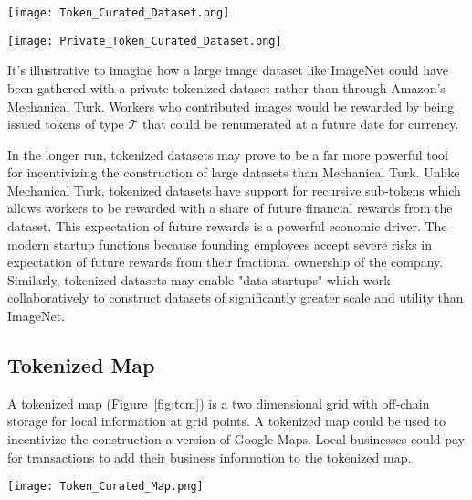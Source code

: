 \documentclass{llncs}
\begin{document}
\begin{figure*}[h]
  \centering
  \texttt{[image: Token\_Curated\_Dataset.png]}
  \caption{A tokenized dataset. For example, the tokenized dataset might hold an image dataset with the images stored off-chain. Note that the data is set to be publicly visible.}
  \label{fig:tcdataset}
\end{figure*}

\begin{figure*}[h]
  \centering
  \texttt{[image: Private\_Token\_Curated\_Dataset.png]}
  \caption{A Private tokenized dataset. In this particular representation, data stored off-chain are not publicly visible.}
  \label{fig:privtcdataset}
\end{figure*}


It's illustrative to imagine how a large image dataset like ImageNet \cite{deng2009imagenet} could have been gathered with a private tokenized dataset rather than through Amazon's Mechanical Turk. Workers who contributed images would be rewarded by being issued tokens of type $\mathcal{T}$ that could be renumerated at a future date for currency.

In the longer run, tokenized datasets may prove to be a far more powerful tool for incentivizing the construction of large datasets than Mechanical Turk. Unlike Mechanical Turk, tokenized datasets have support for recursive sub-tokens which allows workers to be rewarded with a share of future financial rewards from the dataset. This expectation of future rewards is a powerful economic driver. The modern startup functions because founding employees accept severe risks in expectation of future rewards from their fractional ownership of the company. Similarly, tokenized datasets may enable "data startups" which work collaboratively to construct datasets of significantly greater scale and utility than ImageNet.


\subsection{Tokenized Map}

A tokenized map (Figure~\ref{fig:tcm}) is a two dimensional grid with off-chain storage for local information at grid points. A tokenized map could be used to incentivize the construction a version of Google Maps. Local businesses could pay for transactions to add their business information to the tokenized map.


\begin{figure*}
  \centering
  \texttt{[image: Token\_Curated\_Map.png]}
  \caption{A tokenized map.}
  \label{fig:tcm}
  \caption{A tokenized map could be used to construct a dataset analogous to that owned by Google Maps. Business owners could pay to have their information added to the map.}
\end{figure*}
\end{document}
